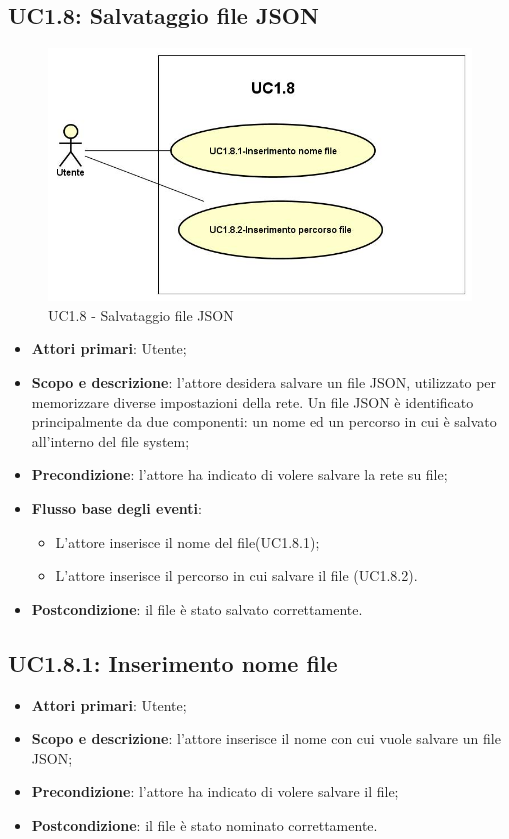 \subsection{UC1.8: Salvataggio file JSON} 
\hypertarget{UC1.8}{} 
\begin{figure} [H]
	\centering
	\includegraphics[scale=0.45]{Img/UC1-8} 
	\caption{UC1.8 - Salvataggio file JSON} \label{} 
\end{figure} 
\begin{itemize} 
	\item{\textbf{Attori primari}: Utente;} 
	\item{\textbf{Scopo e descrizione}: l'attore desidera salvare un file JSON, utilizzato per memorizzare diverse impostazioni della rete. Un file JSON è identificato principalmente da due componenti: un nome ed un percorso in cui è salvato all'interno del file system;} 
	\item{\textbf{Precondizione}: l'attore ha indicato di volere salvare la rete su file;} 
	\item{\textbf{Flusso base degli eventi}: } 
	\begin{itemize} 
		\item{L'attore inserisce il nome del file(UC1.8.1);} 
		\item{L'attore inserisce il percorso in cui salvare il file (UC1.8.2).} 
	\end{itemize} 
	\item{\textbf{Postcondizione}: il file è stato salvato correttamente.} 
\end{itemize} 
\subsection{UC1.8.1: Inserimento nome file} 
\hypertarget{UC1.8.1}{} 
\begin{itemize} 
	\item{\textbf{Attori primari}: Utente;} 
	\item{\textbf{Scopo e descrizione}: l'attore inserisce il nome con cui vuole salvare un file JSON;} 
	\item{\textbf{Precondizione}: l'attore ha indicato di volere salvare il file;} 
	\item{\textbf{Postcondizione}: il file è stato nominato correttamente.} 
\end{itemize} 
